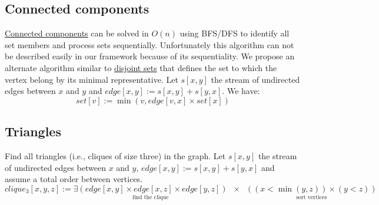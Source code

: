 \documentclass[10pt]{article}
\begin{document}
\subsection{Connected components}
\href{http://en.wikipedia.org/wiki/Connected_component_(graph_theory)}{Connected components} can be solved in $O(n)$ using BFS/DFS to identify all set members and process sets sequentially. Unfortunately this algorithm can not be described easily in our framework because of its sequentiality. We propose an alternate algorithm similar to \href{http://en.wikipedia.org/wiki/Disjoint-set_data_structure}{disjoint sets} that defines the set to which the vertex belong by its minimal representative. Let $s[x,y]$ the stream of undirected edges between $x$ and $y$ and $edge[x,y] := s[x,y]+s[y,x]$. We have:
\[set[v] := \min(v, edge[v,x] \times set[x])\]

\subsection{Triangles}
Find all triangles (i.e., cliques of size three) in the graph. Let $s[x,y]$ the stream of undirected edges between $x$ and $y$, $edge[x,y] := s[x,y]+s[y,x]$ and assume a total order between vertices.
\[clique_3[x,y,z] := \underset{\text{find the clique}}{\exists(edge[x,y] \times edge[x,z] \times edge[y,z])}
	\;\;\times\;\; \underset{\text{sort vertices}}{((x< \min(y,z)) \times (y < z))}\]

\end{document}
